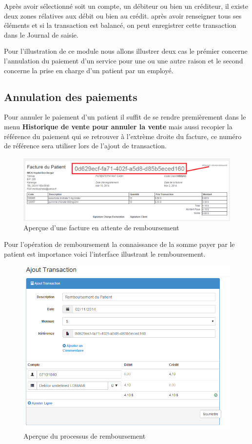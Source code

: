 \documentclass[12pt,a4paper]{report}
\begin{document}
Après avoir sélectionné soit un compte, un débiteur ou bien un créditeur, il existe deux zones rélatives aux débit ou bien au crédit. après avoir renseigner tous ses éléments et si la transaction est balancé, on peut enregistrer cette transaction dans le Journal de saisie.

Pour l'illustration de ce module nous allons illustrer deux cas le prémier concerne l'annulation du paiement d'un service pour une ou une autre raison et le second concerne la prise en charge d'un patient par un employé.

\subsection{Annulation des paiements}
Pour annuler le paiement d'un patient il suffit de se rendre premièrement dans le menu \textbf{Historique de vente pour annuler la vente} mais aussi recopier la référence du paiement qui se retrouver à l'extrème droite du facture, ce numéro de référence sera utiliser lors de l'ajout de transaction.

\begin{figure}[h]
\begin{center}
\includegraphics[width=12cm]{pic/RefDocument.png}
\end{center}
\caption{Aperçue d'une facture en attente de remboursement}
\label{Aperçue d'une facture en attente de remboursement}
\end{figure}
\newpage
Pour l'opération de remboursement la connaissance de la somme payer par le patient est importance voici l'interface illustrant le remboursement.

\begin{figure}[h]
\begin{center}
\includegraphics[width=12cm]{pic/AjouTrans.png}
\end{center}
\caption{Aperçue du processus de remboursement}
\label{Aperçue du processus de remboursement}
\end{figure}
\end{document}
